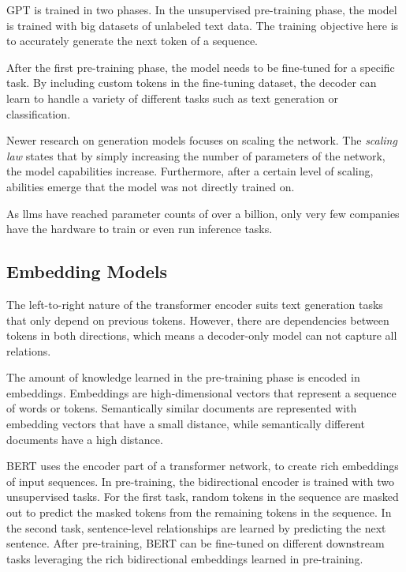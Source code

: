 \documentclass[../main.tex]{subfiles}
\begin{document}
GPT is trained in two phases.
In the unsupervised pre-training phase,
the model is trained with big datasets of unlabeled text data.
The training objective here is
to accurately generate the next token of a sequence.

After the first pre-training phase,
the model needs to be fine-tuned for a specific task.
By including custom tokens in the fine-tuning dataset,
the decoder can learn to handle a variety of different tasks
such as text generation or classification.

Newer research on generation models focuses on scaling the network.
The \emph{scaling law} states
that by simply increasing the number of parameters of the network,
the model capabilities increase.
Furthermore,
after a certain level of scaling,
abilities emerge that the model was not directly trained on.

As \glspl{llm} have reached parameter counts of over a billion,
only very few companies have the hardware to train or even run inference tasks.

\subsection{Embedding Models}
\label{subsec:embedding}

The left-to-right nature of the transformer encoder suits text generation tasks that only depend on previous tokens.
However, there are dependencies between tokens in both directions,
which means a decoder-only model can not capture all relations.

The amount of knowledge learned in the pre-training phase is encoded in embeddings.
Embeddings are high-dimensional vectors that represent a sequence of words or tokens.
Semantically similar documents are represented with embedding vectors that have a small distance,
while semantically different documents have a high distance.

BERT \cite{Devlin2019} uses the encoder part of a transformer network, to create rich embeddings of input sequences.
In pre-training, the bidirectional encoder is trained with two unsupervised tasks.
For the first task,
random tokens in the sequence are masked out to predict the masked tokens from the remaining tokens in the sequence.
In the second task, sentence-level relationships are learned by predicting the next sentence.
After pre-training, BERT can be fine-tuned on different downstream tasks
leveraging the rich bidirectional embeddings learned in pre-training.
\end{document}
